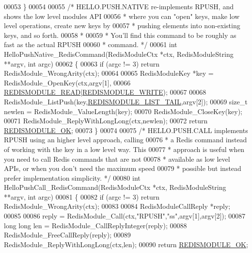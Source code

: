\begin{DoxyCode}
00053 \}
00054 
00055 \textcolor{comment}{/* HELLO.PUSH.NATIVE re-implements RPUSH, and shows the low level modules API}
00056 \textcolor{comment}{ * where you can "open" keys, make low level operations, create new keys by}
00057 \textcolor{comment}{ * pushing elements into non-existing keys, and so forth.}
00058 \textcolor{comment}{ *}
00059 \textcolor{comment}{ * You'll find this command to be roughly as fast as the actual RPUSH}
00060 \textcolor{comment}{ * command. */}
00061 \textcolor{keywordtype}{int} HelloPushNative\_RedisCommand(RedisModuleCtx *ctx, RedisModuleString **argv, \textcolor{keywordtype}{int} argc)
00062 \{
00063     \textcolor{keywordflow}{if} (argc != 3) \textcolor{keywordflow}{return} RedisModule\_WrongArity(ctx);
00064 
00065     RedisModuleKey *key = RedisModule\_OpenKey(ctx,argv[1],
00066         \hyperlink{redismodule_8h_a369d2ff4bca768b05f826a12dd694825}{REDISMODULE\_READ}|\hyperlink{redismodule_8h_a73b37117ef94cb4a904361afcc51b6b4}{REDISMODULE\_WRITE});
00067 
00068     RedisModule\_ListPush(key,\hyperlink{redismodule_8h_a15271c33eee2d766df968558d1e0357c}{REDISMODULE\_LIST\_TAIL},argv[2]);
00069     size\_t newlen = RedisModule\_ValueLength(key);
00070     RedisModule\_CloseKey(key);
00071     RedisModule\_ReplyWithLongLong(ctx,newlen);
00072     \textcolor{keywordflow}{return} \hyperlink{redismodule_8h_a1bc5bfd69abcd378ff52c640adc5418d}{REDISMODULE\_OK};
00073 \}
00074 
00075 \textcolor{comment}{/* HELLO.PUSH.CALL implements RPUSH using an higher level approach, calling}
00076 \textcolor{comment}{ * a Redis command instead of working with the key in a low level way. This}
00077 \textcolor{comment}{ * approach is useful when you need to call Redis commands that are not}
00078 \textcolor{comment}{ * available as low level APIs, or when you don't need the maximum speed}
00079 \textcolor{comment}{ * possible but instead prefer implementation simplicity. */}
00080 \textcolor{keywordtype}{int} HelloPushCall\_RedisCommand(RedisModuleCtx *ctx, RedisModuleString **argv, \textcolor{keywordtype}{int} argc)
00081 \{
00082     \textcolor{keywordflow}{if} (argc != 3) \textcolor{keywordflow}{return} RedisModule\_WrongArity(ctx);
00083 
00084     RedisModuleCallReply *reply;
00085 
00086     reply = RedisModule\_Call(ctx,\textcolor{stringliteral}{"RPUSH"},\textcolor{stringliteral}{"ss"},argv[1],argv[2]);
00087     \textcolor{keywordtype}{long} \textcolor{keywordtype}{long} len = RedisModule\_CallReplyInteger(reply);
00088     RedisModule\_FreeCallReply(reply);
00089     RedisModule\_ReplyWithLongLong(ctx,len);
00090     \textcolor{keywordflow}{return} \hyperlink{redismodule_8h_a1bc5bfd69abcd378ff52c640adc5418d}{REDISMODULE\_OK};

\end{DoxyCode}
